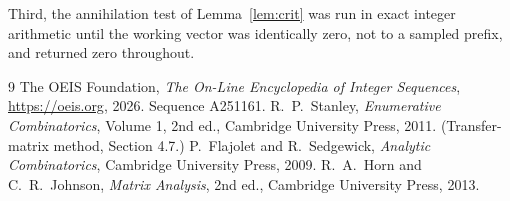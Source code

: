 \documentclass[11pt,a4paper]{article}
\theoremstyle{plain}
\theoremstyle{definition}
\begin{document}
Third, the annihilation test of Lemma~\ref{lem:crit} was run in exact integer arithmetic
until the working vector was identically zero, not to a sampled prefix, and returned zero
throughout.

\begin{thebibliography}{9}
 The OEIS Foundation, \emph{The On-Line Encyclopedia of Integer
Sequences}, \url{https://oeis.org}, 2026. Sequence A251161.
 R.~P.~Stanley, \emph{Enumerative Combinatorics}, Volume 1, 2nd ed.,
Cambridge University Press, 2011. (Transfer-matrix method, Section 4.7.)
 P.~Flajolet and R.~Sedgewick, \emph{Analytic Combinatorics}, Cambridge
University Press, 2009.
 R.~A.~Horn and C.~R.~Johnson, \emph{Matrix Analysis}, 2nd ed., Cambridge
University Press, 2013.
\end{thebibliography}
\end{document}
